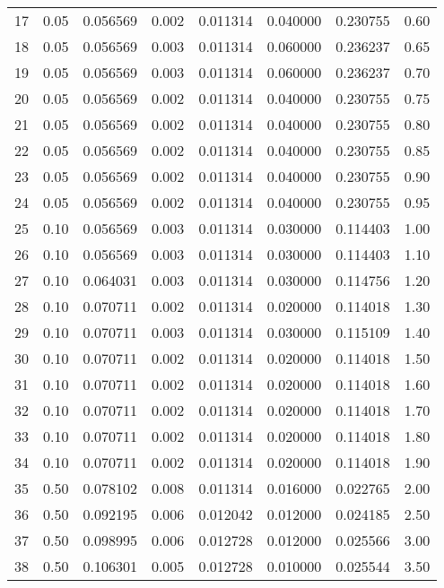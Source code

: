 \begin{center}
\begin{tabular}{gcccc|ccc}
        17 &     0.05 &     0.056569 &     0.002 &      0.011314 &  0.040000 &  0.230755 &  0.60 \\
        18 &     0.05 &     0.056569 &     0.003 &      0.011314 &  0.060000 &  0.236237 &  0.65 \\
        19 &     0.05 &     0.056569 &     0.003 &      0.011314 &  0.060000 &  0.236237 &  0.70 \\
        20 &     0.05 &     0.056569 &     0.002 &      0.011314 &  0.040000 &  0.230755 &  0.75 \\
        21 &     0.05 &     0.056569 &     0.002 &      0.011314 &  0.040000 &  0.230755 &  0.80 \\
        22 &     0.05 &     0.056569 &     0.002 &      0.011314 &  0.040000 &  0.230755 &  0.85 \\
        23 &     0.05 &     0.056569 &     0.002 &      0.011314 &  0.040000 &  0.230755 &  0.90 \\
        24 &     0.05 &     0.056569 &     0.002 &      0.011314 &  0.040000 &  0.230755 &  0.95 \\
        25 &     0.10 &     0.056569 &     0.003 &      0.011314 &  0.030000 &  0.114403 &  1.00 \\
        26 &     0.10 &     0.056569 &     0.003 &      0.011314 &  0.030000 &  0.114403 &  1.10 \\
        27 &     0.10 &     0.064031 &     0.003 &      0.011314 &  0.030000 &  0.114756 &  1.20 \\
        28 &     0.10 &     0.070711 &     0.002 &      0.011314 &  0.020000 &  0.114018 &  1.30 \\
        29 &     0.10 &     0.070711 &     0.003 &      0.011314 &  0.030000 &  0.115109 &  1.40 \\
        30 &     0.10 &     0.070711 &     0.002 &      0.011314 &  0.020000 &  0.114018 &  1.50 \\
        31 &     0.10 &     0.070711 &     0.002 &      0.011314 &  0.020000 &  0.114018 &  1.60 \\
        32 &     0.10 &     0.070711 &     0.002 &      0.011314 &  0.020000 &  0.114018 &  1.70 \\
        33 &     0.10 &     0.070711 &     0.002 &      0.011314 &  0.020000 &  0.114018 &  1.80 \\
        34 &     0.10 &     0.070711 &     0.002 &      0.011314 &  0.020000 &  0.114018 &  1.90 \\
        35 &     0.50 &     0.078102 &     0.008 &      0.011314 &  0.016000 &  0.022765 &  2.00 \\
        36 &     0.50 &     0.092195 &     0.006 &      0.012042 &  0.012000 &  0.024185 &  2.50 \\
        37 &     0.50 &     0.098995 &     0.006 &      0.012728 &  0.012000 &  0.025566 &  3.00 \\
        38 &     0.50 &     0.106301 &     0.005 &      0.012728 &  0.010000 &  0.025544 &  3.50 \\
    \end{tabular}
\end{center}
